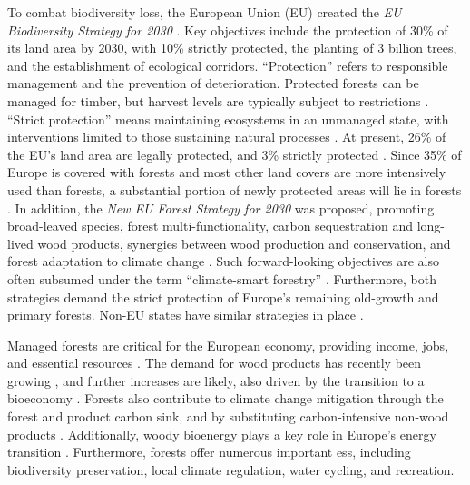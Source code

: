 \documentclass[]{article}
\begin{document}
To combat biodiversity loss, the European Union (EU) created the \textit{EU Biodiversity Strategy for 2030} \parencite{EuropeanCommissionBiodivStrat2020}.
Key objectives include the protection of 30\% of its land area by 2030, with 10\% strictly protected, the planting of 3 billion trees, and the establishment of ecological corridors.
``Protection'' refers to responsible management and the prevention of deterioration. Protected forests can be managed for timber, but harvest levels are typically subject to restrictions \parencite{Verkerk2014}.
``Strict protection'' means maintaining ecosystems in an unmanaged state, with interventions limited to those sustaining natural processes \parencite[e.g., wildlife population control,][]{EUProtectionGuidance2022}.
At present, 26\% of the EU's land area are legally protected, and 3\% strictly protected \parencite{EuropeanCommissionBiodivStrat2020, FORESTEUROPE2020}.
Since 35\% of Europe is covered with forests and most other land covers are more intensively used than forests, a substantial portion of newly protected areas will lie in forests \parencite{Hengl2018, FORESTEUROPE2020}.
In addition, the \textit{New EU Forest Strategy for 2030} was proposed, promoting broad-leaved species, forest multi-functionality, carbon sequestration and long-lived wood products, synergies between wood production and conservation, and forest adaptation to climate change \parencite{EUForestStrategy2030}.
Such forward-looking objectives are also often subsumed under the term ``climate-smart forestry'' \parencite{Nabuurs2018}.
Furthermore, both strategies demand the strict protection of Europe's remaining old-growth and primary forests.
Non-EU states have similar strategies in place \parencite[e.g.,][]{UKbiodiv2023, SwissBiodiv2012}.


Managed forests are critical for the European economy, providing income, jobs, and essential resources \parencite{FORESTEUROPE2020}.
The demand for wood products has recently been growing \parencite{Nabuurs2007, FAOSTAT2022, FAO2022}, and further increases are likely, also driven by the transition to a bioeconomy \parencite{Hurmekoski2022}.
Forests also contribute to climate change mitigation through the forest and product carbon sink, and by substituting carbon-intensive non-wood products \parencite[e.g.,][]{Grassi2021}. Additionally, woody bioenergy plays a key role in Europe's energy transition \parencite{EUForestStrategy2030}.
Furthermore, forests offer numerous important \glspl{es}, including biodiversity preservation, local climate regulation, water cycling, and recreation.
\end{document}
